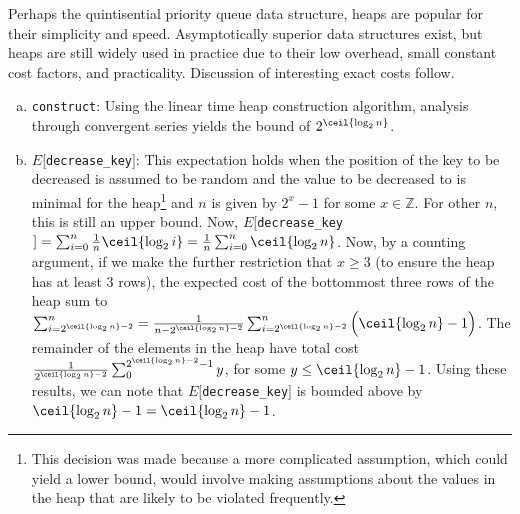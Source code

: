 Perhaps the quintisential priority queue data structure, heaps are popular for their simplicity and speed.  Asymptotically superior data structures exist, but heaps are still widely used in practice due to their low overhead, small constant cost factors, and practicality.  Discussion of interesting exact costs follow.

\begin{enumerate}[a):]

\item \texttt{construct}: Using the linear time heap construction algorithm, analysis through convergent series yields the bound of $2^{\ceil{\log_2 n}}$.

\item $E[$\texttt{decrease\_key}$]$: This expectation holds when the position of the key to be decreased is assumed to be random and the value to be decreased to is minimal for the heap\footnote{This decision was made because a more complicated assumption, which could yield a lower bound, would involve making assumptions about the values in the heap that are likely to be violated frequently.} and $n$ is given by $2^x - 1$ for some $x \in \mathbb{Z}$.  For other $n$, this is still an upper bound.  Now, $E[$\texttt{decrease\_key}$] = \sum_{i = 0}^n \frac{1}{n} \ceil{\log_2 i} = \frac{1}{n} \sum_{i = 0}^n \ceil{\log_2 n}$.  
Now, by a counting argument, if we make the further restriction that $x \geq 3$ (to ensure the heap has at least 3 rows), the expected cost of the bottommost three rows of the heap sum to $\sum_{i = 2 ^ {\ceil{\log_2 n} - 2}}^n = \frac{1}{n - 2 ^ {\ceil{\log_2 n} - 2}} \sum_{i = 2 ^ {\ceil{\log_2 n} - 2}}^n \Big( \ceil{\log_2 n} - 1 \Big)$.  
The remainder of the elements in the heap have total cost $\frac{1}{2 ^ {\ceil{\log_2 n} - 2}} \sum_0^{2 ^ {\ceil{\log_2 n} - 2} - 1} y$, for some $y \leq \ceil{\log_2 n} - 1$.  Using these results, we can note that $E[$\texttt{decrease\_key}$]$ is bounded above by $\ceil{\log_2 n} - 1 = \ceil{\log_2 n} - 1$.

\end{enumerate}
